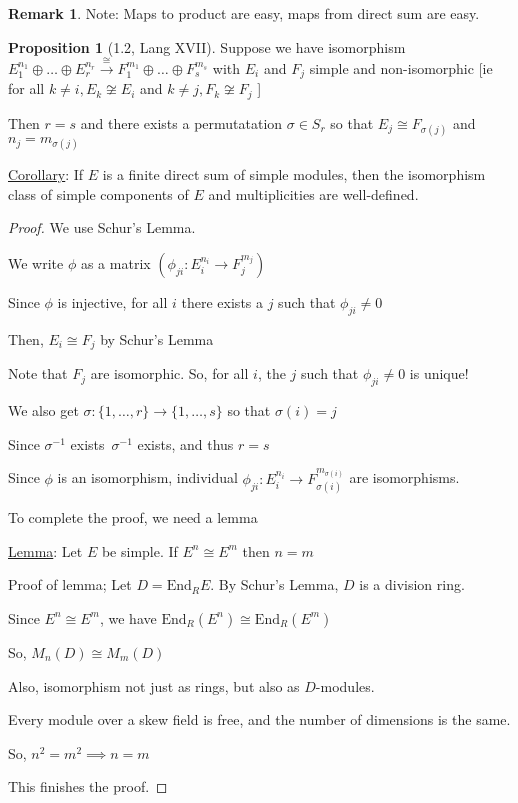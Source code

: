 \documentclass{article}
\theoremstyle{definition}
\newtheorem{proposition}[theorem]{Proposition}
\newtheorem*{remark}{Remark}
\begin{document}
 
\begin{remark}
    Note: Maps to product are easy, maps from direct sum are easy.    
\end{remark}

\begin{proposition}
    [1.2, Lang XVII]

    Suppose we have isomorphism \(E_1^{n_1} \oplus \dots \oplus E_r^{n_r} \overset{\cong }{\to } F_1^{m_1} \oplus \dots \oplus F_s^{m_s}\) with \(E_i\) and \(F_j\) simple and non-isomorphic [ie for all \(k \neq i, E_k \not \cong E_i\) and \(k \neq j, F_k \not\cong F_j\)  ]
    
    Then \(r = s\) and there exists a permutatation \(\sigma \in S_r\) so that \(E_j \cong F_{\sigma(j)}\) and \(n_j = m_{\sigma(j)}\) 
\end{proposition}

\underline{Corollary}: If \(E\) is a finite direct sum of simple modules, then the isomorphism class of simple components of \(E\) and multiplicities are well-defined.

\begin{proof}
    We use Schur's Lemma.

    We write \(\phi\) as a matrix \((\phi_{ji}: E_i^{n_i} \to F_j^{m_j})\)

    Since \(\phi\) is injective, for all \(i\) there exists a \(j\) such that \(\phi_{ji} \neq 0\)

    Then, \(E_i \cong F_j\) by Schur's Lemma

    Note that \(F_j\) are isomorphic. So, for all \(i\), the \(j\) such that \(\phi_{ji} \neq 0\) is unique!

    We also get \(\sigma:\{ 1, \dots , r \} \to \{ 1,\dots ,s \} \) so that \(\sigma(i)=j\) 

    Since \(\sigma ^{-1} \) exists\, \(\sigma ^{-1}\) exists, and thus \(r = s\) 

    Since \(\phi\) is an isomorphism, individual \(\phi_{ji} : E_i^{n_i} \to F_{\sigma(i)}^{m_{\sigma(i)}}\) are isomorphisms.

    To complete the proof, we need a lemma

    \underline{Lemma}: Let \(E\) be simple. If \(E^n \cong E^m\) then \(n = m\)
    
    Proof of lemma; Let \(D = \text{End}_R E\). By Schur's Lemma, \(D\) is a division ring.

    Since \(E^n \cong E^m\), we have \(\text{End}_R(E^n) \cong \text{End}_R(E^m)\)

    So, \(M_n(D) \cong M_m(D)\) 

    Also, isomorphism not just as rings, but also as \(D\)-modules.

    Every module over a skew field is free, and the number of dimensions is the same.

    So, \(n^2 = m^2 \implies n = m\) 

    This finishes the proof.

\end{proof}
\end{document}
